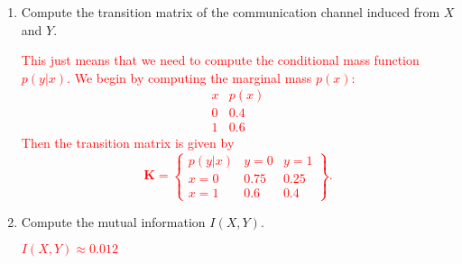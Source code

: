 \documentclass[12pt,reqno]{amsart}
\begin{document}
\bigskip
\begin{enumerate}
\item Compute the transition matrix of the communication channel induced from $X$ and $Y$.

\bigskip
\textcolor{red}{This just means that we need to compute the conditional mass function $p(y|x)$. We begin by computing the marginal mass $p(x)$:
	\[\begin{array}{c|c}
	x & p(x) \\ \hline
	0 & 0.4 \\
	1 & 0.6
	\end{array}
	\]
Then the transition matrix is given by
	\[\mathbf{K} = \left\{\begin{array}{c|cc}
	p(y|x) & y=0 & y=1 \\ \hline
	x = 0 & 0.75 & 0.25 \\
	x = 1 & 0.6 & 0.4
	\end{array}\right\}.
	\]}
\bigskip

\item Compute the mutual information $I(X,Y)$.

\bigskip
\textcolor{red}{$I(X,Y) \approx 0.012$}
\bigskip
\end{enumerate}
\end{document}
